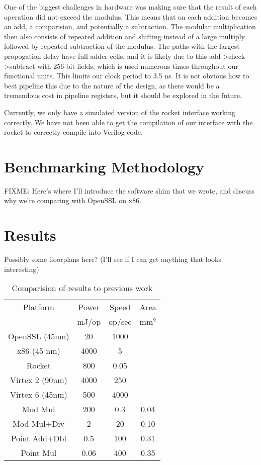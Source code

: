 \documentclass[twocolumn]{article}
\begin{document}
One of the biggest challenges in hardware was making sure that the result of each 
operation did not exceed the modulus. This means that on each addition becomes an 
add, a comparision, and potentially a subtraction. The modular multiplication then 
also consists of repeated addition and shifting instead of a large multiply followed
by repeated subtraction of the modulus. The paths with the largest propogation delay
have full adder cells, and it is likely due to this add->check->subtract with 
256-bit fields, which is used numerous times throughout our functional units. This 
limits our clock period to 3.5 ns. It is not obvious how to best pipeline this due 
to the nature of the design, as there would be a tremendous cost in pipeline registsrs, 
but it should be explored in the future. 

Currently, we only have a simulated version of the rocket interface working correctly. 
We have not been able to get the compilation of our interface with the rocket to correctly
compile into Verilog code. 

\section{Benchmarking Methodology}

FIXME: Here's where I'll introduce the software shim that we wrote,
and discuss why we're comparing with OpenSSL on x86.

\section{Results}

Possibly some floorplans here?
(I'll see if I can get anything that looks interesting)

\begin{table}[ht]
  \begin{center}
    \begin{tabular}{c|ccc}
      Platform        & Power & Speed  & Area \\
                      & mJ/op & op/sec & mm$^2$ \\
      \hline
      OpenSSL (45nm)  & 20    & 1000   &      \\
      x86 (45 nm)     & 4000  & 5      &      \\
      Rocket          & 800   & 0.05   &      \\
      Virtex 2 (90nm) & 4000  & 250    &      \\
      Virtex 6 (45nm) & 500   & 4000   &      \\
      \hline
      Mod Mul         & 200   & 0.3    & 0.04 \\
      Mod Mul+Div     & 2     & 20     & 0.10 \\
      Point Add+Dbl   & 0.5   & 100    & 0.31 \\
      Point Mul       & 0.06  & 400    & 0.35 \\
    \end{tabular}
  \end{center}

  \caption{Comparision of results to previous work
    \label{results}}
\end{table}
\end{document}
